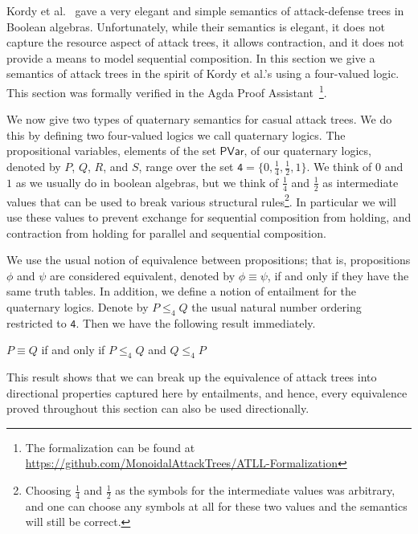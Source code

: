 \newcommand{\forth}{\frac{1}{4}}
\newcommand{\half}{\frac{1}{2}}

Kordy et al.~\cite{Kordy:2012} gave a very elegant and simple
semantics of attack-defense trees in Boolean algebras.  Unfortunately,
while their semantics is elegant, it does not capture the resource
aspect of attack trees, it allows contraction, and it does not provide
a means to model sequential composition.  In this section we give a
semantics of attack trees in the spirit of Kordy et al.'s using a
four-valued logic.  This section was formally verified in the Agda
Proof Assistant~\cite{Norell:2009}\footnote{The formalization can be
  found at
  \url{https://github.com/MonoidalAttackTrees/ATLL-Formalization}}.

 We now give two types of quaternary semantics for casual attack
 trees.  We do this by defining two four-valued logics we call
 quaternary logics.  The propositional variables, elements of the set
 $\mathsf{PVar}$, of our quaternary logics, denoted by $P$, $Q$, $R$,
 and $S$, range over the set $\mathsf{4} = \{0, \forth, \half, 1\}$.
 We think of $0$ and $1$ as we usually do in boolean algebras, but we
 think of $\forth$ and $\half$ as intermediate values that can be used
 to break various structural rules\footnote{Choosing $\forth$ and
   $\half$ as the symbols for the intermediate values was arbitrary,
   and one can choose any symbols at all for these two values and the
   semantics will still be correct.}.  In particular we will use these
 values to prevent exchange for sequential composition from holding,
 and contraction from holding for parallel and sequential composition.

We use the usual notion of equivalence between propositions; that is,
propositions $\phi$ and $\psi$ are considered equivalent, denoted by
$\phi \equiv \psi$, if and only if they have the same truth tables.
In addition, we define a notion of entailment for the quaternary
logics.  Denote by $P \leq_4 Q$ the usual natural number ordering
restricted to $\mathsf{4}$.  Then we have the following result
immediately.
\begin{lemma}
  \label{lemma:entailment_in_the_quaternary_semantics}
  $P \equiv Q$ if and only if $P \leq_4 Q$ and $Q \leq_4 P$
\end{lemma}
This result shows that we can break up the equivalence of attack trees
into directional properties captured here by entailments, and hence,
every equivalence proved throughout this section can also be used
directionally.

